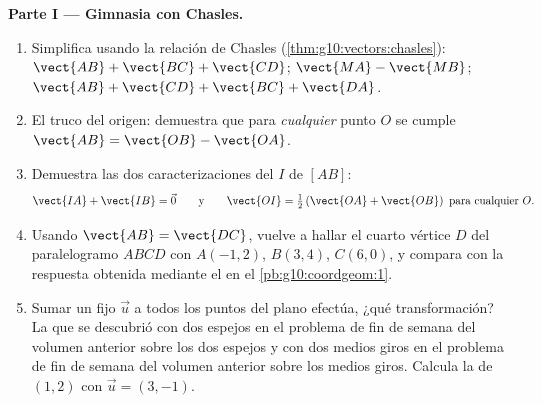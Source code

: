 \begin{problem}
\medskip
\noindent\textbf{Parte I --- Gimnasia con Chasles.}
\begin{enumerate}
  \item Simplifica usando la relación de Chasles
        (\cref{thm:g10:vectors:chasles}):
        $\vect{AB} + \vect{BC} + \vect{CD}$; \quad
        $\vect{MA} - \vect{MB}$; \quad
        $\vect{AB} + \vect{CD} + \vect{BC} + \vect{DA}$.
  \item El truco del origen: demuestra que para \emph{cualquier} punto
        $O$ se cumple $\vect{AB} = \vect{OB} - \vect{OA}$.
  \item Demuestra las dos caracterizaciones del  $I$ de
        $[AB]$:
        \[
        \vect{IA} + \vect{IB} = \vec 0
        \qquad\text{y}\qquad
        \vect{OI} = \tfrac12\left(\vect{OA} + \vect{OB}\right)
        \ \text{para cualquier } O .
        \]
  \item Usando $\vect{AB} = \vect{DC}$, vuelve a hallar el cuarto vértice
        $D$ del paralelogramo $ABCD$ con $A(-1, 2)$, $B(3, 4)$, $C(6, 0)$,
        y compara con la respuesta obtenida mediante el  en el
        \cref{pb:g10:coordgeom:1}.
  \item Sumar un  fijo $\vec u$ a todos los puntos del plano
        efectúa, ¿qué transformación? La que se descubrió con dos espejos
        en el problema de fin de semana del volumen anterior sobre los dos
        espejos y con dos medios giros en el problema de fin de semana del
        volumen anterior sobre los medios giros. Calcula la  de
        $(1, 2)$ con $\vec u = (3, -1)$.
\end{enumerate}


\end{problem}
